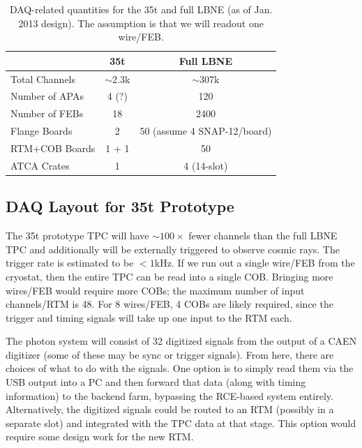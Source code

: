 \begin{table}[tbh]
\begin{center}
\begin{tabular}{|l|c|c|}   
\hline \hline 
    & 35t  & Full LBNE \\      
\hline
   Total Channels        & $\sim$2.3k &$\sim$307k \\ 
	Number of APAs     &  4 (?)     &    120        \\ 
   Number of FEBs       & 18 & 2400 \\ 
   Flange Boards    & 2   & 50 (assume 4 SNAP-12/board) \\ 
   RTM+COB Boards    & 1 + 1 &  50  \\
   ATCA Crates            & 1   &  4 (14-slot)   \\ 
\hline \hline
\end{tabular}
\caption[]{DAQ-related quantities for the 35t and full LBNE (as of Jan. 2013 design).  The assumption is that we will readout one wire/FEB.}
\label{tab:daqsumm} 
\end{center}
\end{table}





\subsection{DAQ Layout for 35t Prototype}

The 35t prototype TPC will have $\sim 100\times$ fewer channels than the full LBNE TPC and additionally will be externally triggered to observe cosmic rays.  The trigger rate is estimated to be  $<1$kHz.  If we run out a single wire/FEB from the cryostat, then the entire TPC can be read into a single COB.  
Bringing more wires/FEB would require more COBs; the maximum number of input channels/RTM is 48.  For 8 wires/FEB, 4 COBs are likely required, since the trigger and timing signals will take up one input to the RTM each.  

The photon system will consist of 32 digitized signals from the output of a CAEN digitizer (some of these may be sync or trigger signals).  From here, there are choices of what to do with the signals.  One option is to simply read them via the USB output into a PC and then forward that data (along with timing information) to the backend farm, bypassing the RCE-based system entirely.  Alternatively, the digitized signals could be routed to an RTM (possibly in a separate slot) and integrated with the TPC data at that stage.  This option would require some design work for the new RTM.  

